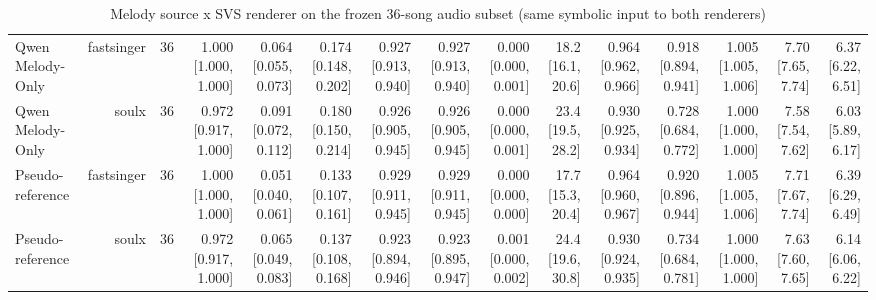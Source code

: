 \begin{table}[t]
\begin{tabular}{lrrrrrrrrrrrrrr}
Qwen Melody-Only & fastsinger & 36 & 1.000 [1.000, 1.000] & 0.064 [0.055, 0.073] & 0.174 [0.148, 0.202] & 0.927 [0.913, 0.940] & 0.927 [0.913, 0.940] & 0.000 [0.000, 0.001] & 18.2 [16.1, 20.6] & 0.964 [0.962, 0.966] & 0.918 [0.894, 0.941] & 1.005 [1.005, 1.006] & 7.70 [7.65, 7.74] & 6.37 [6.22, 6.51] \\
Qwen Melody-Only & soulx & 36 & 0.972 [0.917, 1.000] & 0.091 [0.072, 0.112] & 0.180 [0.150, 0.214] & 0.926 [0.905, 0.945] & 0.926 [0.905, 0.945] & 0.000 [0.000, 0.001] & 23.4 [19.5, 28.2] & 0.930 [0.925, 0.934] & 0.728 [0.684, 0.772] & 1.000 [1.000, 1.000] & 7.58 [7.54, 7.62] & 6.03 [5.89, 6.17] \\
Pseudo-reference & fastsinger & 36 & 1.000 [1.000, 1.000] & 0.051 [0.040, 0.061] & 0.133 [0.107, 0.161] & 0.929 [0.911, 0.945] & 0.929 [0.911, 0.945] & 0.000 [0.000, 0.000] & 17.7 [15.3, 20.4] & 0.964 [0.960, 0.967] & 0.920 [0.896, 0.944] & 1.005 [1.005, 1.006] & 7.71 [7.67, 7.74] & 6.39 [6.29, 6.49] \\
Pseudo-reference & soulx & 36 & 0.972 [0.917, 1.000] & 0.065 [0.049, 0.083] & 0.137 [0.108, 0.168] & 0.923 [0.894, 0.946] & 0.923 [0.895, 0.947] & 0.001 [0.000, 0.002] & 24.4 [19.6, 30.8] & 0.930 [0.924, 0.935] & 0.734 [0.684, 0.781] & 1.000 [1.000, 1.000] & 7.63 [7.60, 7.65] & 6.14 [6.06, 6.22] \\
\bottomrule
\end{tabular}
\caption{Melody source x SVS renderer on the frozen 36-song audio subset (same symbolic input to both renderers)}
\label{tab:svs_cross_render}
\end{table}
